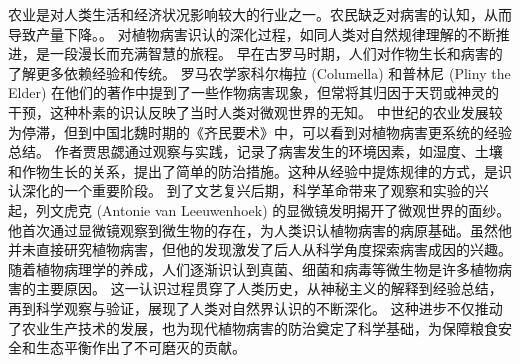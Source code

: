 \documentclass[AutoFakeBold]{LZUThesis-PgD&PhD}
\begin{document}
	农业是对人类生活和经济状况影响较大的行业之一。农民缺乏对病害的认知，从而导致产量下降。\cite{plantleaf_disease_dl}。
	对植物病害识认的深化过程，如同人类对自然规律理解的不断推进，是一段漫长而充满智慧的旅程。
	早在古罗马时期，人们对作物生长和病害的了解更多依赖经验和传统。
	罗马农学家科尔梅拉 (Columella) 和普林尼 (Pliny the Elder) 在他们的著作中提到了一些作物病害现象，但常将其归因于天罚或神灵的干预，这种朴素的识认反映了当时人类对微观世界的无知\cite{columella1941agriculture}。
	中世纪的农业发展较为停滞，但到中国北魏时期的《齐民要术》中，可以看到对植物病害更系统的经验总结。
	作者贾思勰通过观察与实践，记录了病害发生的环境因素，如湿度、土壤和作物生长的关系，提出了简单的防治措施\cite{jia535qimin}。这种从经验中提炼规律的方式，是识认深化的一个重要阶段。
	到了文艺复兴后期，科学革命带来了观察和实验的兴起，列文虎克 (Antonie van Leeuwenhoek) 的显微镜发明揭开了微观世界的面纱。他首次通过显微镜观察到微生物的存在，为人类识认植物病害的病原基础。虽然他并未直接研究植物病害，但他的发现激发了后人从科学角度探索病害成因的兴趣\cite{leeuwenhoek1683observations}。
	随着植物病理学的养成，人们逐渐识认到真菌、细菌和病毒等微生物是许多植物病害的主要原因\cite{agrios2005plant}。
	这一认识过程贯穿了人类历史，从神秘主义的解释到经验总结，再到科学观察与验证，展现了人类对自然界认识的不断深化。
	这种进步不仅推动了农业生产技术的发展，也为现代植物病害的防治奠定了科学基础，为保障粮食安全和生态平衡作出了不可磨灭的贡献。
\end{document}
